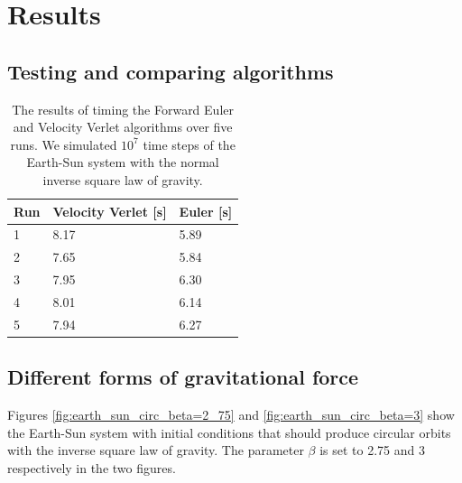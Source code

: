 \documentclass[reprint, english,notitlepage,nofootinbib]{revtex4-1}  %
\begin{document}
\section{Results}

\subsection{Testing and comparing algorithms}

\begin{table}[]
\begin{tabular}{|l|l|l|}
  \hline
Run & Velocity Verlet {[}s{]} & Euler {[}s{]} \\
\hline
1   & 8.17                    & 5.89          \\
2   & 7.65                    & 5.84          \\
3   & 7.95                    & 6.30          \\
4   & 8.01                    & 6.14          \\
5   & 7.94                    & 6.27          \\
\hline
\end{tabular}
\caption{The results of timing the Forward Euler and Velocity Verlet algorithms over five runs. We simulated $10^7$ time steps of the Earth-Sun system with the normal inverse square law of gravity.}
\label{tab:timing}
\end{table}


\subsection{Different forms of gravitational force}

Figures \ref{fig:earth_sun_circ_beta=2_75} and \ref{fig:earth_sun_circ_beta=3} show the Earth-Sun system with initial conditions that should produce circular orbits with the inverse square law of gravity. The parameter $\beta$ is set to 2.75 and 3 respectively in the two figures.
\end{document}
